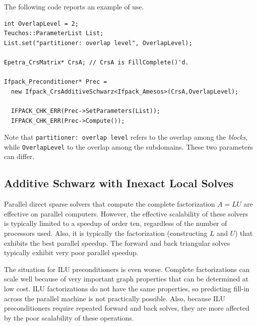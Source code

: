 The following code reports an example of use.
\begin{verbatim}
int OverlapLevel = 2;
Teuchos::ParameterList List;
List.set("partitioner: overlap level", OverlapLevel);

Epetra_CrsMatrix* CrsA; // CrsA is FillComplete()'d.

Ifpack_Preconditioner* Prec =
  new Ifpack_CrsAdditiveSchwarz<Ifpack_Amesos>(CrsA,OverlapLevel);

  IFPACK_CHK_ERR(Prec->SetParameters(List));
  IFPACK_CHK_ERR(Prec->Compute());
\end{verbatim}

Note that \verb~partitioner: overlap level~ refers to the overlap among the
{\sl blocks}, while \verb~OverlapLevel~ to the overlap among the subdomains.
These two parameters can differ.

\subsection{Additive Schwarz with Inexact Local Solves}
\label{sec:as_ilu}

Parallel direct sparse solvers that compute the complete factorization $A=LU$
are effective on parallel computers.  However, the effective scalability
of these solvers is typically limited to a speedup of order ten, regardless
of the number of processors used.  Also, it is typically the factorization
(constructing $L$ and $U$) that exhibits the best parallel speedup.  The 
forward and back triangular solves typically exhibit very poor parallel speedup.

The situation for ILU preconditioners is even worse.  Complete factorizations
can scale well because of very important graph properties that can be determined
at low cost.  ILU factorizations do not have the same properties, so predicting
fill-in across the parallel machine is not practically possible.  Also, because ILU
preconditioners require repeated forward and back solves, they are more affected
by the poor scalability of these operations.

